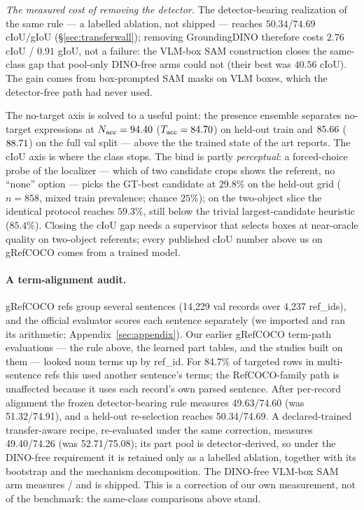 \emph{The measured cost of removing the detector.} The detector-bearing
realization of the same rule --- a labelled ablation, not shipped --- reaches
$50.34$/$74.69$ cIoU/gIoU (\S\ref{sec:transferwall}); removing GroundingDINO
therefore costs $2.76$ cIoU / $0.91$ gIoU, not a failure: the VLM-box SAM
construction closes the same-class gap that pool-only DINO-free arms could not
(their best was $40.56$ cIoU). The gain comes from box-prompted SAM masks on
VLM boxes, which the detector-free path had never used.

The no-target axis is solved to a useful point: the presence ensemble
separates no-target expressions at $N_{\mathrm{acc}}=94.40$
($T_{\mathrm{acc}}=84.70$) on held-out train and $85.66$
($88.71$) on the full val split --- above the \wallTrainedNAcc{} the
trained state of the art reports. The cIoU axis is where the class stops. The
bind is partly \emph{perceptual}: a forced-choice probe of the localizer ---
which of two candidate crops shows the referent, no ``none'' option --- picks
the GT-best candidate at $29.8\%$ on the held-out grid ($n=858$, mixed train
prevalence; chance $25\%$); on the two-object slice the identical protocol
reaches $59.3\%$, still below the trivial largest-candidate heuristic
($85.4\%$). Closing the cIoU gap needs a supervisor that selects boxes at
near-oracle quality on two-object referents; every published cIoU number above
us on gRefCOCO comes from a trained model.

\paragraph{A term-alignment audit.}
gRefCOCO refs group several sentences (14{,}229 val records over 4{,}237
ref\_ids), and the official evaluator scores each sentence separately (we
imported and ran its arithmetic; Appendix~\ref{sec:appendix}). Our earlier
gRefCOCO term-path evaluations --- the rule above, the learned part tables,
and the studies built on them --- looked noun terms up by ref\_id. For 84.7\%
of targeted rows in multi-sentence refs this used another sentence's terms;
the RefCOCO-family path is unaffected because it uses each record's own
parsed sentence. After per-record alignment the frozen detector-bearing rule
measures 49.63/74.60 (was 51.32/74.91), and a held-out re-selection reaches
50.34/74.69. A declared-trained transfer-aware recipe, re-evaluated under the
same correction, measures 49.40/74.26 (was 52.71/75.08); its part pool is
detector-derived, so under the DINO-free requirement it is retained only as a
labelled ablation, together with its bootstrap and the mechanism
decomposition. The DINO-free VLM-box SAM arm measures
\grefCIoU{}/\grefGIoU{} and is shipped. This is a correction of our own
measurement, not of the benchmark: the same-class comparisons above stand.

